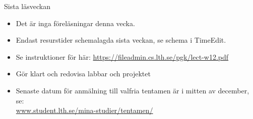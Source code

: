

\ifkompendium\else


\begin{Slide}{Sista läsveckan}

  \begin{itemize}
    \item Det är inga föreläsningar denna vecka.
    \item Endast resurstider schemalagda sista veckan, se schema i TimeEdit.
    \item Se instruktioner för  här: \url{https://fileadmin.cs.lth.se/pgk/lect-w12.pdf}
    \item Gör klart och redovisa  labbar och projektet
    \item Senaste datum för anmälning till valfria tentamen är i mitten av december, se: \\\href{https://www.student.lth.se/mina-studier/tentamen/}{www.student.lth.se/mina-studier/tentamen/}
  \end{itemize}

\end{Slide}



\fi
